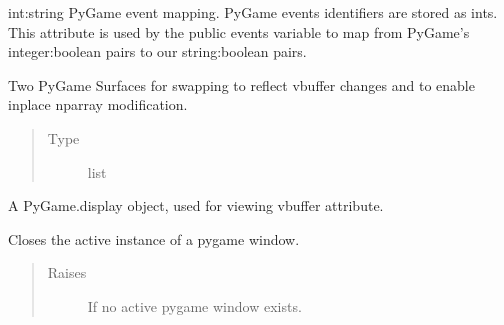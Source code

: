 \documentclass[letterpaper,10pt,english,openany,oneside]{sphinxmanual}
\begin{document}
\begin{fulllineitems}
\begin{fulllineitems}
\pysigstartsignatures
{}
\pysigstopsignatures
\sphinxAtStartPar
int:string PyGame event mapping. PyGame events identifiers are
stored as ints. This attribute is used by the public events
variable to map from PyGame’s integer:boolean pairs to
our string:boolean pairs.

\end{fulllineitems}



\begin{fulllineitems}

\pysigstartsignatures
{}
\pysigstopsignatures
\sphinxAtStartPar
Two PyGame Surfaces for swapping to reflect vbuffer changes and
to enable in\sphinxhyphen{}place nparray modification.
\begin{quote}\begin{description}
\item[{Type}] \leavevmode
\sphinxAtStartPar
list

\end{description}\end{quote}

\end{fulllineitems}



\begin{fulllineitems}

\pysigstartsignatures
{}
\pysigstopsignatures
\sphinxAtStartPar
A PyGame.display object, used for viewing vbuffer attribute.

\end{fulllineitems}



\begin{fulllineitems}

\pysigstartsignatures
{}
\pysigstopsignatures
\sphinxAtStartPar
Closes the active instance of a pygame window.
\begin{quote}\begin{description}
\item[{Raises}] \leavevmode
\sphinxAtStartPar
{} \textendash{} If no active pygame window exists.

\end{description}\end{quote}


\end{fulllineitems}
\end{fulllineitems}
\end{document}
